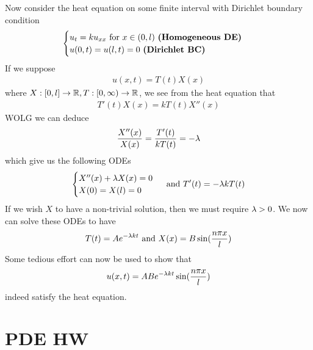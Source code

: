 \documentclass{report}
\begin{document}
\begin{mdframed}
Now consider the heat equation on some finite interval with Dirichlet boundary condition 
\begin{align*}
\begin{cases}
  u_{t}=ku_{xx}\text{ for }x\in (0,l)\text{ \textbf{(Homogeneous DE)} } \\
  u(0,t)=u(l,t)=0\text{ \textbf{(Dirichlet BC)} }
\end{cases}
\end{align*}
If we suppose 
\begin{align*}
u(x,t)=T(t)X(x)
\end{align*}
where $X:[0,l]\rightarrow \mathbb{R},T:[0,\infty)\rightarrow \mathbb{R}$, we see from the heat equation that 
\begin{align*}
T'(t)X(x)=k T(t)X''(x)
\end{align*}
WOLG we can deduce 
\begin{align*}
\frac{X''(x)}{X(x)}= \frac{T'(t)}{kT(t)}=-\lambda 
\end{align*}
which give us the following ODEs 
\begin{align*}
\begin{cases}
  X''(x)+\lambda  X(x)=0 \\
  X(0)=X(l)=0
\end{cases}\text{ and }T'(t)=-\lambda  kT(t)
\end{align*}
If we wish $X$ to have a non-trivial solution, then we must require  $\lambda >0$. We now can solve these ODEs to have 
\begin{align*}
T(t)=Ae^{-\lambda  kt}\text{ and }X(x)= B\sin ( \frac{n \pi x}{l})
\end{align*}
Some tedious effort can now be used to show that 
\begin{align*}
u(x,t)=AB e^{-\lambda  kt}\sin (\frac{n \pi x}{l})
\end{align*}
indeed satisfy the heat equation. 
\end{mdframed}
\chapter{PDE HW}
\end{document}
